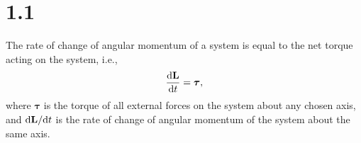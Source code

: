 \section{1.1}
\label{sec:1.1}


\begin{prin}
  \label{prin:angularMomentum}
  The rate of change of angular momentum of a system is equal to
  the net torque acting on the system,
  i.e.,
  \begin{equation}
    \frac{\mathrm{d} \mathbf{L}}{\mathrm{d} t} = \boldsymbol\tau,
  \end{equation}
  where $\boldsymbol\tau$ is the torque of all external forces on the system
  about any chosen axis,
  and $\mathrm{d} \mathbf{L}/\mathrm{d} t$ is the rate of change of
  angular momentum of the system about the same axis.
\end{prin}


